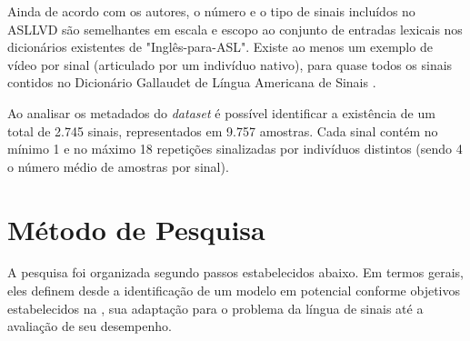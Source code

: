 Ainda de acordo com os autores, o número e o tipo de sinais incluídos no ASLLVD são semelhantes em escala e escopo ao conjunto de entradas lexicais nos dicionários existentes de "Inglês-para-ASL". Existe ao menos um exemplo de vídeo por sinal (articulado por um indivíduo nativo), para quase todos os sinais contidos no Dicionário Gallaudet de Língua Americana de Sinais \cite{athitsos-asllvd-2008, gallaudet-2005}. 

Ao analisar os metadados do \textit{dataset} é possível identificar a existência de um total de 2.745 sinais, representados em 9.757 amostras. Cada sinal contém no mínimo 1 e no máximo 18 repetições sinalizadas por indivíduos distintos (sendo 4 o número médio de amostras por sinal).


\section{Método de Pesquisa} %

A pesquisa foi organizada segundo passos estabelecidos abaixo. Em termos gerais, eles definem desde a identificação de um modelo em potencial conforme objetivos estabelecidos na , sua adaptação para o problema da língua de sinais até a avaliação de seu desempenho.

